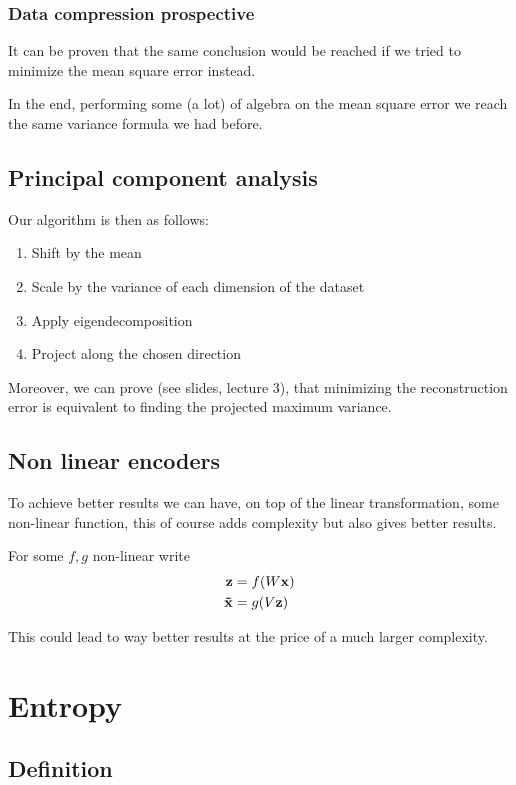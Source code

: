 \documentclass[12pt]{extarticle}
\renewcommand{\vec}[1]{\bvec{#1}}
\begin{document}
\subsubsection{Data compression prospective}
It can be proven that the same conclusion would be reached if we tried to minimize the mean square
error instead.

In the end, performing some (a lot) of algebra on the mean square error we reach the same variance
formula we had before.

\subsection{Principal component analysis}

Our algorithm is then as follows:
\begin{enumerate}[label=\roman*.]
	\item Shift by the mean
	\item Scale by the variance of each dimension of the dataset
	\item Apply eigendecomposition
	\item Project along the chosen direction
\end{enumerate}

Moreover, we can prove (see slides, lecture 3), that minimizing the reconstruction error
is equivalent to finding the projected maximum variance.

\subsection{Non linear encoders}
To achieve better results we can have, on top of the linear transformation, some non-linear function,
this of course adds complexity but also gives better results.

For some $f, g$ non-linear write
\begin{align}
	\vec z          & = f(W \vec x) \\
	\vec {\tilde x} & = g(V \vec z)
\end{align}

This could lead to way better results at the price of a much larger complexity.

\section{Entropy}

\subsection{Definition}
\end{document}
